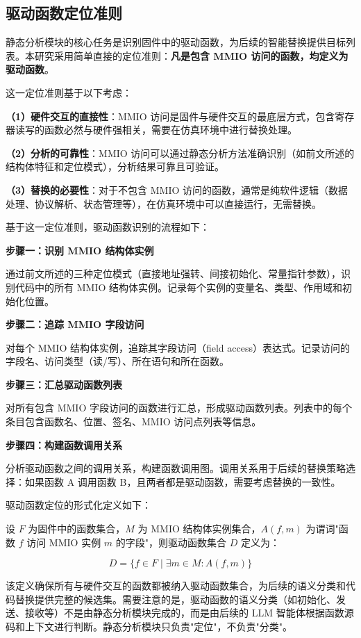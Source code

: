 \subsection{驱动函数定位准则}

静态分析模块的核心任务是识别固件中的驱动函数，为后续的智能替换提供目标列表。本研究采用简单直接的定位准则：\textbf{凡是包含 MMIO 访问的函数，均定义为驱动函数}。

这一定位准则基于以下考虑：

\textbf{（1）硬件交互的直接性}：MMIO 访问是固件与硬件交互的最底层方式，包含寄存器读写的函数必然与硬件强相关，需要在仿真环境中进行替换处理。

\textbf{（2）分析的可靠性}：MMIO 访问可以通过静态分析方法准确识别（如前文所述的结构体特征和定位模式），分析结果可靠且可验证。

\textbf{（3）替换的必要性}：对于不包含 MMIO 访问的函数，通常是纯软件逻辑（数据处理、协议解析、状态管理等），在仿真环境中可以直接运行，无需替换。

基于这一定位准则，驱动函数识别的流程如下：

\textbf{步骤一：识别 MMIO 结构体实例}

通过前文所述的三种定位模式（直接地址强转、间接初始化、常量指针参数），识别代码中的所有 MMIO 结构体实例。记录每个实例的变量名、类型、作用域和初始化位置。

\textbf{步骤二：追踪 MMIO 字段访问}

对每个 MMIO 结构体实例，追踪其字段访问（field access）表达式。记录访问的字段名、访问类型（读/写）、所在语句和所在函数。

\textbf{步骤三：汇总驱动函数列表}

对所有包含 MMIO 字段访问的函数进行汇总，形成驱动函数列表。列表中的每个条目包含函数名、位置、签名、MMIO 访问点列表等信息。

\textbf{步骤四：构建函数调用关系}

分析驱动函数之间的调用关系，构建函数调用图。调用关系用于后续的替换策略选择：如果函数 A 调用函数 B，且两者都是驱动函数，需要考虑替换的一致性。

驱动函数定位的形式化定义如下：

设 $F$ 为固件中的函数集合，$M$ 为 MMIO 结构体实例集合，$A(f, m)$ 为谓词"函数 $f$ 访问 MMIO 实例 $m$ 的字段"，则驱动函数集合 $D$ 定义为：

$$D = \{f \in F \mid \exists m \in M: A(f, m)\}$$

该定义确保所有与硬件交互的函数都被纳入驱动函数集合，为后续的语义分类和代码替换提供完整的候选集。需要注意的是，驱动函数的语义分类（如初始化、发送、接收等）不是由静态分析模块完成的，而是由后续的 LLM 智能体根据函数源码和上下文进行判断。静态分析模块只负责"定位"，不负责"分类"。

